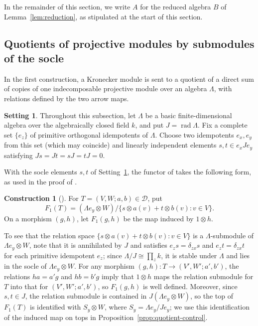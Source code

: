\documentclass[a4paper,reqno,10pt]{amsart}
\theoremstyle{definition}
\newtheorem{construction}[theorem]{Construction}
\newtheorem{setting}[theorem]{Setting}
\DeclareMathOperator{\rad}{rad}
\newcommand{\D}{\mathcal D}
\numberwithin{equation}{section}
\begin{document}
In the remainder of this section, we write $A$ for the reduced algebra $B$
of Lemma~\ref{lem:reduction}, as stipulated at the start of this section.

\subsection{Quotients of projective modules by submodules of the socle}
\label{sec:quotients}
In the first construction, a Kronecker module is sent to a quotient of a direct sum of copies of one indecomposable projective module over an algebra $\Lambda$, with relations defined by the two arrow maps.

\begin{setting}\label{set:quotient}
Throughout this subsection, let $\Lambda$ be a basic finite-dimensional
algebra over the algebraically closed field $k$, and put $J=\rad\Lambda$.
Fix a complete set $\{e_z\}$ of primitive orthogonal idempotents of $\Lambda$.
Choose two idempotents $e_x,e_y$ from this set (which may coincide) and
linearly independent elements $s,t\in e_xJe_y$ satisfying $Js=Jt=sJ=tJ=0$.
\end{setting}

With the socle elements $s,t$ of Setting~\ref{set:quotient}, the functor
of \cite[\S3.1]{Bongartz} takes the following form, as used in the proof
of \cite[Corollary~2]{Bongartz}.
\begin{construction}[{\cite[\S3.1]{Bongartz}}]
\label{con:quotient}
For $T=(V,W;a,b)\in\D$, put
\begin{equation}\label{eq:quotient-construction}
 F_1(T)=(\Lambda e_y\otimes W)/
 \{s\otimes a(v)+t\otimes b(v):v\in V\}.
\end{equation}
On a morphism $(g,h)$, let $F_1(g,h)$ be the map induced by $1\otimes h$.
\end{construction}
To see that the relation space $\{s\otimes a(v)+t\otimes b(v):v\in V\}$ is a $\Lambda$-submodule of $\Lambda e_y\otimes W$, note that it
is annihilated by $J$ and satisfies $e_zs=\delta_{zx}s$ and $e_zt=\delta_{zx}t$ for
each primitive idempotent $e_z$; since $\Lambda/J\cong\prod_z k$, it is
stable under $\Lambda$ and lies in
the socle of $\Lambda e_y\otimes W$. For any morphism $(g,h):T\to(V',W';a',b')$, the relations
$ha=a'g$ and $hb=b'g$ imply that $1\otimes h$ maps the relation submodule for $T$ into that for $(V',W';a',b')$, so $F_1(g,h)$ is well defined. Moreover, since $s,t\in J$, the relation submodule is contained in
$J(\Lambda e_y\otimes W)$, so the top of $F_1(T)$ is identified with $S_y\otimes W$, where
$S_y=\Lambda e_y/Je_y$; we use this identification of the induced map on tops in
Proposition~\ref{prop:quotient-control}.
\end{document}
